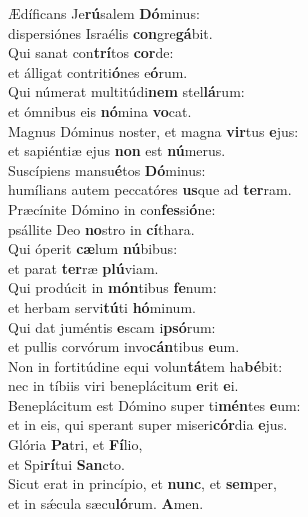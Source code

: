 \evenverse Ædíficans Je\textbf{rú}salem \textbf{Dó}minus:~\*\\
\evenverse dispersiónes Israélis \textbf{con}gre\textbf{gá}bit.\\
\oddverse Qui sanat con\textbf{trí}tos \textbf{cor}de:~\*\\
\oddverse et álligat contriti\textbf{ó}nes e\textbf{ó}rum.\\
\evenverse Qui númerat multitúdi\textbf{nem} stel\textbf{lá}rum:~\*\\
\evenverse et ómnibus eis \textbf{nó}mina \textbf{vo}cat.\\
\oddverse Magnus Dóminus noster, et magna \textbf{vir}tus \textbf{e}jus:~\*\\
\oddverse et sapiéntiæ ejus \textbf{non} est \textbf{nú}merus.\\
\evenverse Suscípiens mansu\textbf{é}tos \textbf{Dó}minus:~\*\\
\evenverse humílians autem peccatóres \textbf{us}que ad \textbf{ter}ram.\\
\oddverse Præcínite Dómino in con\textbf{fes}si\textbf{ó}ne:~\*\\
\oddverse psállite Deo \textbf{no}stro in \textbf{cí}thara.\\
\evenverse Qui óperit \textbf{cæ}lum \textbf{nú}bibus:~\*\\
\evenverse et parat \textbf{ter}ræ \textbf{plú}viam.\\
\oddverse Qui prodúcit in \textbf{món}tibus \textbf{fe}num:~\*\\
\oddverse et herbam servi\textbf{tú}ti \textbf{hó}minum.\\
\evenverse Qui dat juméntis \textbf{e}scam i\textbf{psó}rum:~\*\\
\evenverse et pullis corvórum invo\textbf{cán}tibus \textbf{e}um.\\
\oddverse Non in fortitúdine equi volun\textbf{tá}tem ha\textbf{bé}bit:~\*\\
\oddverse nec in tíbiis viri beneplácitum \textbf{e}rit \textbf{e}i.\\
\evenverse Beneplácitum est Dómino super ti\textbf{mén}tes \textbf{e}um:~\*\\
\evenverse et in eis, qui sperant super miseri\textbf{cór}dia \textbf{e}jus.\\
\oddverse Glória \textbf{Pa}tri, et \textbf{Fí}lio,~\*\\
\oddverse et Spi\textbf{rí}tui \textbf{San}cto.\\
\evenverse Sicut erat in princípio, et \textbf{nunc}, et \textbf{sem}per,~\*\\
\evenverse et in sǽcula sæcu\textbf{ló}rum. \textbf{A}men.\\
